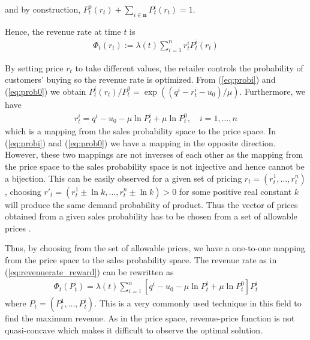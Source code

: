 and by construction, $P_t^0(r_t) + \sum_{i \in \mathbf{n}}P_t^i(r_t) = 1$.

Hence, the revenue rate at time $t$ is 
\begin{align}
\Phi_t(r_t):=\lambda(t) \sum_{i=1}^{n}r_t^iP_t^i(r_t) \label{eq:revenuerate_reward}
\end{align}

By setting price $r_t$ to take different values, the retailer controls the probability of customers' buying so the revenue rate is optimized. From (\ref{eq:probi}) and (\ref{eq:prob0}) we obtain $P_t^i(r_t)/P_t^0=\exp ((q^i-r_t^i-u_0)/\mu)$. Furthermore, we have
\begin{align}
r_t^i=q^i-u_0-\mu \ln P_t^i + \mu \ln P_t^0, \quad i=1,\ldots, n \label{eq:pricetoprob}
\end{align}
which is a mapping from the sales probability space to the price space. In (\ref{eq:probi}) and (\ref{eq:prob0}) we have a mapping in the opposite direction. However, these two mappings are not inverses of each other as the mapping from the price space to the sales probability space is not injective and hence cannot be a bijection. This can be easily observed for a given set of pricing $r_t = (r_t^1,\ldots,r_t^n)$, choosing $r'_t = (r_t^1\pm\ln k,\ldots,r_t^n\pm \ln k)>0$ for some positive real constant $k$ will produce the same demand probability of product. Thus the vector of prices obtained from a given sales probability has to be chosen from a set of allowable prices  \cite{Gallego1997}.


Thus, by choosing from the set of allowable prices, we have a one-to-one mapping from the price space to the sales probability space. The revenue rate as in (\ref{eq:revenuerate_reward}) can be rewritten as 
\begin{align}
\Phi_t(P_t) = \lambda(t)\sum_{i=1}^{n}\left[q^i-u_0-\mu \ln P_t^i + \mu \ln P_t^0 \right]P_t^i\label{eq:revenuerate_prob}
\end{align}
where $P_t = (P_t^1,\ldots, P_t^i)$. This is a very commonly used technique in this field to find the maximum revenue. As in the price space, revenue-price function is not quasi-concave which makes it difficult to observe the optimal solution.


